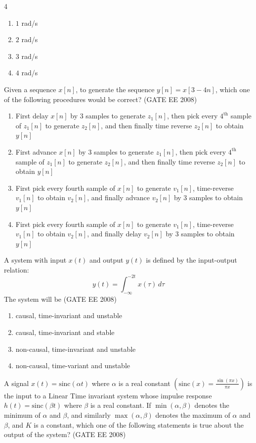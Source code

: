 \begin{multicols}{4}
\begin{enumerate}
    \item $1$ rad/s
    \item $2$ rad/s
    \item $3$ rad/s
    \item $4$ rad/s
\end{enumerate}
\end{multicols}
%
\item Given a sequence $x[n]$, to generate the sequence $y[n]=x[3-4n]$, which one of the following procedures would be correct?
\hfill (GATE EE 2008)
%
\begin{enumerate}
    \item First delay $x[n]$ by 3 samples to generate $z_{1}[n]$, then pick every $4^{\text{th}}$ sample of $z_{1}[n]$ to generate $z_{2}[n]$, and then finally time reverse $z_{2}[n]$ to obtain $y[n]$
    \item First advance $x[n]$ by 3 samples to generate $z_{1}[n]$, then pick every $4^{\text{th}}$ sample of $z_{1}[n]$ to generate $z_{2}[n]$, and then finally time reverse $z_{2}[n]$ to obtain $y[n]$
    \item First pick every fourth sample of $x[n]$ to generate $v_{1}[n]$, time-reverse $v_{1}[n]$ to obtain $v_{2}[n]$, and finally advance $v_{2}[n]$ by 3 samples to obtain $y[n]$
    \item First pick every fourth sample of $x[n]$ to generate $v_{1}[n]$, time-reverse $v_{1}[n]$ to obtain $v_{2}[n]$, and finally delay $v_{2}[n]$ by 3 samples to obtain $y[n]$
\end{enumerate}
\item A system with input $x(t)$ and output $y(t)$ is defined by the input-output relation:
$$
y(t) = \int_{-\infty}^{-2t} x(\tau) \,d\tau
$$
The system will be
\hfill (GATE EE 2008)
\begin{enumerate}
    \item causal, time-invariant and unstable
    \item causal, time-invariant and stable
    \item non-causal, time-invariant and unstable
    \item non-causal, time-variant and unstable
\end{enumerate}
\item A signal $x(t)=\text{sinc}(\alpha t)$ where $\alpha$ is a real constant $\left(\text{sinc}(x) = \frac{\sin(\pi x)}{\pi x}\right)$ is the input to a Linear Time invariant system whose impulse response $h(t)=\text{sinc}(\beta t)$ where $\beta$ is a real constant. If $\min(\alpha, \beta)$ denotes the minimum of $\alpha$ and $\beta$, and similarly $\max(\alpha, \beta)$ denotes the maximum of $\alpha$ and $\beta$, and $K$ is a constant, which one of the following statements is true about the output of the system?
\hfill (GATE EE 2008)

